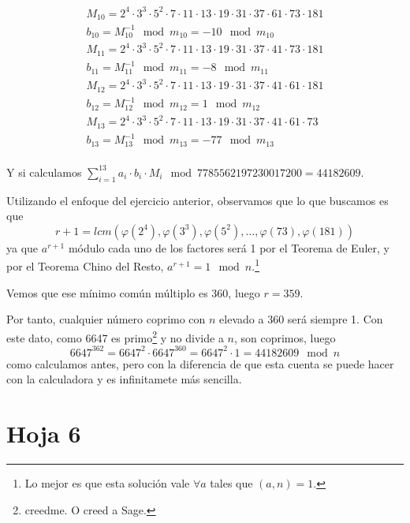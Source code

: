 \begin{problem} [9]
\begin{enumerate}
\begin{align*}
M_{10} = 2^4\cdot3^3\cdot5^2\cdot7\cdot11\cdot13\cdot19\cdot31\cdot37\cdot61\cdot73\cdot181\\
b_{10} = M_{10}^{-1} \mod m_{10} = -10 \mod m_{10}\\
M_{11} = 2^4\cdot3^3\cdot5^2\cdot7\cdot11\cdot13\cdot19\cdot31\cdot37\cdot41\cdot73\cdot181\\
b_{11} = M_{11}^{-1} \mod m_{11} = -8 \mod m_{11}\\
M_{12} = 2^4\cdot3^3\cdot5^2\cdot7\cdot11\cdot13\cdot19\cdot31\cdot37\cdot41\cdot61\cdot181\\
b_{12} = M_{12}^{-1} \mod m_{12} = 1 \mod m_{12}\\
M_{13} = 2^4\cdot3^3\cdot5^2\cdot7\cdot11\cdot13\cdot19\cdot31\cdot37\cdot41\cdot61\cdot73\\
b_{13} = M_{13}^{-1} \mod m_{13} = -77 \mod m_{13}\\
\end{align*}

Y si calculamos $\sum\limits_{i=1}^{13} a_i \cdot b_i \cdot M_i \mod 7785562197230017200 = 44182609$.

\spart

Utilizando el enfoque del ejercicio anterior, observamos que lo que buscamos es que
\[r + 1 = lcm(\varphi(2^4), \varphi(3^3), \varphi(5^2), \dots , \varphi(73), \varphi(181))\]
ya que $a^{r+1}$ módulo cada uno de los factores será 1 por el Teorema de Euler, y por el Teorema Chino del Resto, $a^{r+1} = 1 \mod n$.\footnote{Lo mejor es que esta solución vale $\forall a $ tales que $(a,n)=1$.}

Vemos que ese mínimo común múltiplo es 360, luego $r = 359$.

Por tanto, cualquier número coprimo con $n$ elevado a $360$ será siempre 1. Con este dato, como 6647 es primo\footnote{creedme. O creed a Sage.} y no divide a $n$, son coprimos, luego
\[ 6647^{362} = 6647^{2} \cdot 6647^{360} = 6647^{2} \cdot 1 = 44182609 \mod n \]
como calculamos antes, pero con la diferencia de que esta cuenta se puede hacer con la calculadora y es infinitamete más sencilla.

\end{enumerate}

\end{problem}

\section{Hoja 6}

